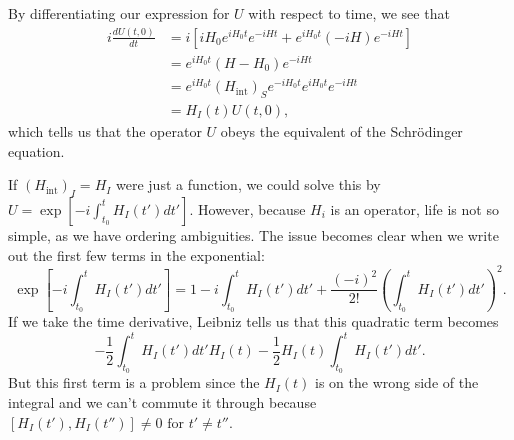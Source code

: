 By differentiating our expression for $U$ with respect to time, we see that
\begin{align*}
    i\frac{dU(t,0)}{dt} &= 
        i\left[iH_0 e^{iH_0 t}e^{-iHt}+e^{iH_0t}(-iH) e^{-iHt}\right]\\
    &= e^{iH_0t} (H-H_0)e^{-iHt}\\
    &= e^{iH_0t} (H_{\mathrm{int}})_S e^{-iH_0t} e^{iH_0t} e^{-iHt}\\
    &= H_I(t) U(t,0),
\end{align*}
which tells us that the operator $U$ obeys the equivalent of the Schr\"odinger equation.

If $(H_{\mathrm{int}})_I=H_I$ were just a function, we could solve this by $U=\exp[-i \int_{t_0}^t H_I(t')dt'].$ However, because $H_i$ is an operator, life is not so simple, as we have ordering ambiguities. The issue becomes clear when we write out the first few terms in the exponential:
\begin{equation}
    \exp[-i \int_{t_0}^t H_I(t')dt']=1-i \int_{t_0}^t H_I(t')dt'+\frac{(-i)^2}{2!}\left(\int_{t_0}^t H_I(t')dt'\right)^2.
\end{equation}
If we take the time derivative, Leibniz tells us that this quadratic term becomes
\begin{equation}
    -\frac{1}{2}\int_{t_0}^t H_I(t')dt' H_I(t)-\frac{1}{2} H_I(t) \int_{t_0}^t H_I(t')dt'.
\end{equation}
But this first term is a problem since the $H_I(t)$ is on the wrong side of the integral and we can't commute it through because $[H_I(t'),H_I(t'')]\neq 0 \text{ for }t'\neq t''$.

